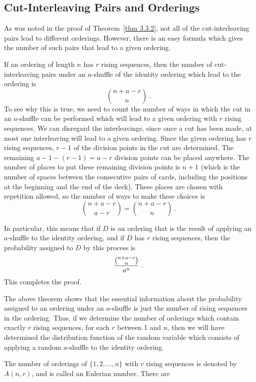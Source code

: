 \subsection*{Cut-Interleaving Pairs and Orderings}
As was noted in the proof of Theorem~\ref{thm 3.3.2}, not all of the cut-interleaving pairs lead to
different orderings.  However, there is an easy formula which gives the number of such pairs that
lead to a given ordering.  
\begin{theorem}\label{thm 3.3.3} If an ordering of length $n$ has $r$ rising
sequences, then the number of cut-interleaving pairs under an $a$-shuffle of the
identity ordering which lead to the ordering is 
$${{n + a - r}\choose{n}}\ .$$
\proof  To see why this is true, we need to count the number of ways in which the cut
in an $a$-shuffle can be performed which will lead to a given ordering with $r$ rising
sequences.  We can disregard the interleavings, since once a cut has been made, at
most one interleaving will lead to a given ordering.  Since the given ordering has $r$
rising sequences, $r-1$ of the division points in the cut are determined.  The remaining $a
- 1 - (r - 1) = a - r$ division points can be placed anywhere.  The number of places to put
these remaining division points is $n+1$ (which is the number of spaces between the
consecutive pairs of cards, including the positions at the beginning and the end of the
deck).  These places are chosen with repetition allowed, so the number of ways to make these
choices is
$${{n + a - r}\choose{a-r}} = {{n + a - r}\choose{n}}\ .$$
\par In particular, this means that if $D$ is an ordering that is the result of
applying an
$a$-shuffle to the identity ordering, and if $D$ has $r$ rising sequences, then the
probability assigned to $D$ by this process is
$${{{{n + a - r}\choose{n}}}\over{a^n}}\ .$$ This completes the proof.
\end{theorem}
\par
The above theorem shows that the essential information about the
probability assigned to an ordering under an $a$-shuffle is just the number of rising
sequences in the ordering.  Thus, if we determine the number of orderings which
contain exactly $r$ rising sequences, for each $r$ between 1 and $n$, then we will
have determined the distribution function of the random variable which consists of
applying a random $a$-shuffle to the identity ordering.
\par The number of orderings of $\{1, 2, \ldots, n\}$ with $r$ rising sequences is
denoted by $A(n, r)$, and is called an Eulerian number.  There are 
